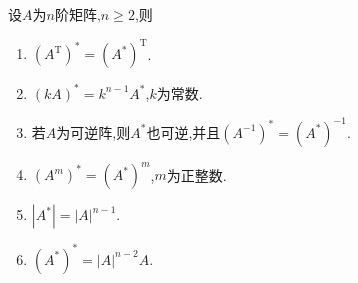 \documentclass[../../main.tex]{subfiles}
\begin{document}
\begin{proposition}[伴随矩阵的性质]\label{proposition:伴随矩阵的性质}
设\(A\)为\(n\)阶矩阵,\(n\geq 2\),则
\begin{enumerate}
\item\label{伴随矩阵的性质1}  \((A^{\mathrm{T}})^* = (A^*)^{\mathrm{T}}\).

\item  \((kA)^* = k^{n - 1}A^*\),\(k\)为常数.

\item\label{伴随矩阵的性质3}  若$A$为可逆阵,则$A^*$也可逆,并且\((A^{-1})^* = (A^*)^{-1}\).

\item  \((A^{m})^* = (A^*)^{m}\),\(m\)为正整数.

\item\label{伴随矩阵的性质5}  \(|A^*| = |A|^{n - 1}\).

\item  \((A^*)^* = |A|^{n - 2}A\).
\end{enumerate}
\end{proposition}
\end{document}

